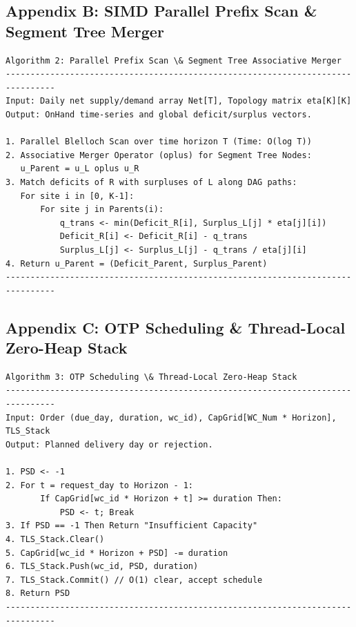 \documentclass[11pt,a4paper]{article}
\begin{document}
\subsection*{Appendix B: SIMD Parallel Prefix Scan \& Segment Tree Merger}
\begin{verbatim}
Algorithm 2: Parallel Prefix Scan \& Segment Tree Associative Merger
--------------------------------------------------------------------------------
Input: Daily net supply/demand array Net[T], Topology matrix eta[K][K]
Output: OnHand time-series and global deficit/surplus vectors.

1. Parallel Blelloch Scan over time horizon T (Time: O(log T))
2. Associative Merger Operator (oplus) for Segment Tree Nodes:
   u_Parent = u_L oplus u_R
3. Match deficits of R with surpluses of L along DAG paths:
   For site i in [0, K-1]:
       For site j in Parents(i):
           q_trans <- min(Deficit_R[i], Surplus_L[j] * eta[j][i])
           Deficit_R[i] <- Deficit_R[i] - q_trans
           Surplus_L[j] <- Surplus_L[j] - q_trans / eta[j][i]
4. Return u_Parent = (Deficit_Parent, Surplus_Parent)
--------------------------------------------------------------------------------
\end{verbatim}

\subsection*{Appendix C: OTP Scheduling \& Thread-Local Zero-Heap Stack}
\begin{verbatim}
Algorithm 3: OTP Scheduling \& Thread-Local Zero-Heap Stack
--------------------------------------------------------------------------------
Input: Order (due_day, duration, wc_id), CapGrid[WC_Num * Horizon], TLS_Stack
Output: Planned delivery day or rejection.

1. PSD <- -1
2. For t = request_day to Horizon - 1:
       If CapGrid[wc_id * Horizon + t] >= duration Then:
           PSD <- t; Break
3. If PSD == -1 Then Return "Insufficient Capacity"
4. TLS_Stack.Clear()
5. CapGrid[wc_id * Horizon + PSD] -= duration
6. TLS_Stack.Push(wc_id, PSD, duration)
7. TLS_Stack.Commit() // O(1) clear, accept schedule
8. Return PSD
--------------------------------------------------------------------------------
\end{verbatim}
\end{document}
